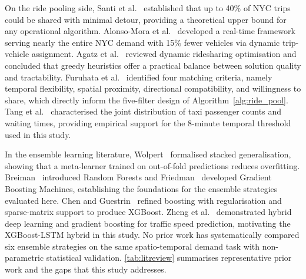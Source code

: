 \documentclass[a4paper,fleqn]{cas-dc}
\begin{document}
On the ride pooling side, Santi et al.~\cite{santi2014quantifying} established that up to 40\% of NYC trips could be shared with minimal detour, providing a theoretical upper bound for any operational algorithm.  Alonso-Mora et al.~\cite{alonso2017demand} developed a real-time framework serving nearly the entire NYC demand with 15\% fewer vehicles via dynamic trip-vehicle assignment.  Agatz et al.~\cite{agatz2012ridesharing} reviewed dynamic ridesharing optimisation and concluded that greedy heuristics offer a practical balance between solution quality and tractability.  Furuhata et al.~\cite{furuhata2013ridesharing} identified four matching criteria, namely temporal flexibility, spatial proximity, directional compatibility, and willingness to share, which directly inform the five-filter design of Algorithm~\ref{alg:ride_pool}.  Tang et al.~\cite{tang2018joint} characterised the joint distribution of taxi passenger counts and waiting times, providing empirical support for the 8-minute temporal threshold used in this study.

In the ensemble learning literature, Wolpert~\cite{wolpert1992stacking} formalised stacked generalisation, showing that a meta-learner trained on out-of-fold predictions reduces overfitting.  Breiman~\cite{breiman2001rf} introduced Random Forests and Friedman~\cite{friedman2001gbm} developed Gradient Boosting Machines, establishing the foundations for the ensemble strategies evaluated here.  Chen and Guestrin~\cite{chen2016xgboost} refined boosting with regularisation and sparse-matrix support to produce XGBoost.  Zheng et al.~\cite{zheng2020hybrid} demonstrated hybrid deep learning and gradient boosting for traffic speed prediction, motivating the XGBoost-LSTM hybrid in this study.  No prior work has systematically compared six ensemble strategies on the same spatio-temporal demand task with non-parametric statistical validation.  \autoref{tab:litreview} summarises representative prior work and the gaps that this study addresses.
\end{document}
